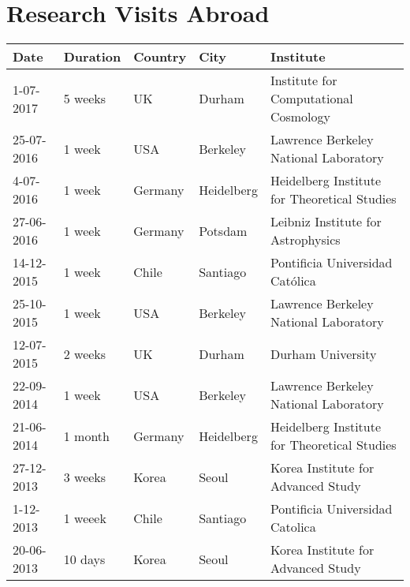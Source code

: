 \documentclass{report}
\begin{document}
\section*{Research Visits Abroad}

\begin{tabular}{p{1.7cm} p{1.3cm} p{1.5cm} p{1.5cm} p{7.0cm}}\hline
Date & Duration & Country & City & Institute\\\hline
1-07-2017 & 5 weeks & UK & Durham & Institute for Computational Cosmology\\
25-07-2016 & 1 week & USA & Berkeley & Lawrence Berkeley National Laboratory\\
4-07-2016 & 1 week & Germany & Heidelberg & Heidelberg Institute for Theoretical Studies \\
27-06-2016 & 1 week & Germany & Potsdam & Leibniz Institute for Astrophysics \\
14-12-2015 & 1 week & Chile & Santiago & Pontificia Universidad Cat\'olica\\
25-10-2015 & 1 week & USA & Berkeley & Lawrence Berkeley National Laboratory\\
12-07-2015 & 2 weeks & UK & Durham & Durham University\\
22-09-2014 & 1 week & USA & Berkeley & Lawrence Berkeley National Laboratory\\ 
21-06-2014 & 1 month & Germany & Heidelberg & Heidelberg Institute for Theoretical Studies \\
27-12-2013 & 3 weeks & Korea & Seoul & Korea Institute for Advanced Study\\
1-12-2013 & 1 weeek & Chile & Santiago & Pontificia Universidad Catolica\\
20-06-2013 & 10 days & Korea & Seoul & Korea Institute for Advanced Study\\\hline
\end{tabular}
\end{document}
